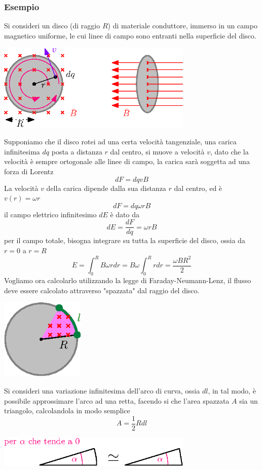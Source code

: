 \documentclass[10pt, letterpaper]{report}
\begin{document}
\subsubsection{Esempio}
Si consideri un disco (di raggio $R$) di materiale conduttore, immerso in un campo magnetico uniforme, le cui linee di campo sono entranti nella superficie del disco.\begin{center}
    \includegraphics[width=0.7\textwidth ]{images/discoMagnetico.eps}
\end{center}
Supponiamo che il disco rotei ad una certa velocità tangenziale, una carica infinitesima $dq$ posta a distanza $r$ dal centro, si muove a velocità $v$, dato che la velocità è sempre ortogonale alle linee di campo, la carica sarà soggetta ad una forza di Lorentz 
$$ dF=dqvB$$
La velocità $v$ della carica dipende dalla sua distanza $r$ dal centro, ed è $v(r)=\omega r$
$$ dF=dq\omega rB$$
il campo elettrico infinitesimo $dE$ è dato da 
$$ dE = \frac{dF}{dq}=\omega rB$$
per il campo totale, bisogna integrare su tutta la superficie del disco, ossia da $r=0$ a $r=R$ 
$$ E=\int_0^R B\omega r  dr =B\omega \int_0^R  r  dr=\frac{\omega B R^2}{2}  $$
Vogliamo ora calcolarlo utilizzando la legge di Faraday-Neumann-Lenz, il flusso deve essere calcolato attraverso "spazzata" dal raggio del disco.\begin{center}
    \includegraphics[width=0.3\textwidth ]{images/discoMagnetico2.eps}
\end{center}
Si consideri una variazione infinitesima dell'arco di curva, ossia $dl$, in tal modo, è possibile approssimare l'arco ad una retta, facendo si che l'area spazzata $A$ sia un triangolo, calcolandola in modo semplice $$A=\frac{1}{2}R dl$$
\begin{center}
    \includegraphics[width=0.7\textwidth ]{images/alphaA0.eps}
\end{center}
\end{document}
